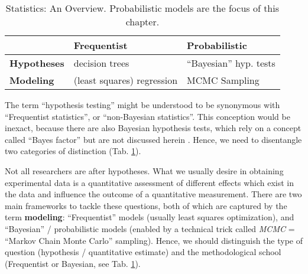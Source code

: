 \begin{table}[p!]
\caption{\label{tab:statistics}Statistics: An Overview. Probabilistic models are the focus of this chapter.}
\centering
\begin{tabular}{|l|l|l|}
\hline
 & \textbf{Frequentist} & \textbf{Probabilistic}\\[0pt]
\hline
\textbf{Hypotheses} & decision trees & ``Bayesian'' hyp. tests\\[0pt]
\hline
\textbf{Modeling} & (least squares) regression & MCMC Sampling\\[0pt]
\hline
\end{tabular}
\end{table}



\FloatBarrier
The term ``hypothesis testing'' might be understood to be synonymous with ``Frequentist statistics'', or ``non-Bayesian statistics''.
This conception would be inexact, because there are also Bayesian hypothesis tests, which rely on a concept called ``Bayes factor'' but are not discussed herein \citep[cf.][]{Shikano2019}.
Hence, we need to disentangle two categories of distinction (Tab. \ref{tab:statistics}).

Not all researchers are after hypotheses.
What we usually desire in obtaining experimental data is a quantitative assessment of different effects which exist in the data and influence the outcome of a quantitative measurement.
There are two main frameworks to tackle these questions, both of which are captured by the term \textbf{modeling}: ``Frequentist'' models (usually least squares optimization), and ``Bayesian'' / probabilistic models (enabled by a technical trick called \emph{MCMC} = ``Markov Chain Monte Carlo'' sampling).
Hence, we should distinguish the type of question (hypothesis / quantitative estimate) and the methodological school (Frequentist or Bayesian, see Tab. \ref{tab:statistics}).



